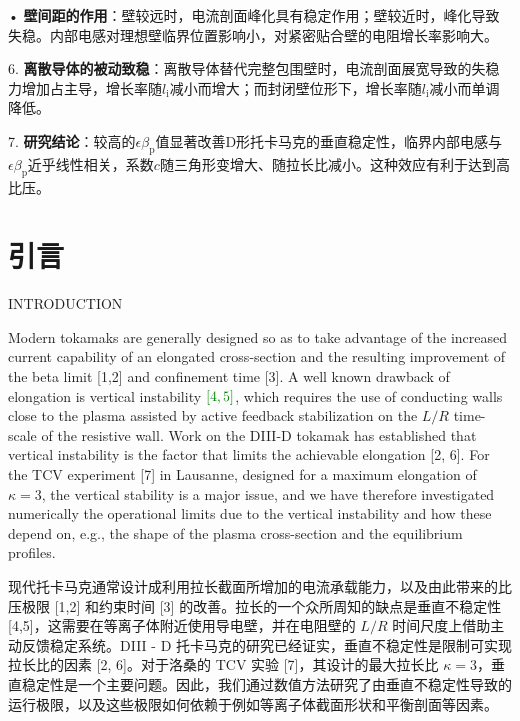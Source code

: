 \documentclass[utf8]{ctexart}
\newcommand\mainskip{-5pt}
\newcommand\enzhbox[2]{
  	\quad\par \begin{paracol}{2} \colseprulecolor{black} 
  		\begin{spacing}{1.0}
  			\footnotesize  #1
  		\end{spacing}
  		\switchcolumn[1] 
  		#2
  	\end{paracol} \quad\par
  }
\begin{document}
\begin{sloppypar}
\begin{adjustwidth}{0.1\linewidth}{0.1\linewidth}
  • \textbf{壁间距的作用}：壁较远时，电流剖面峰化具有稳定作用；壁较近时，峰化导致失稳。内部电感对理想壁临界位置影响小，对紧密贴合壁的电阻增长率影响大。

6. \textbf{离散导体的被动致稳}：离散导体替代完整包围壁时，电流剖面展宽导致的失稳力增加占主导，增长率随$l_{\mathrm{i}}$减小而增大；而封闭壁位形下，增长率随$l_{\mathrm{i}}$减小而单调降低。

7. \textbf{研究结论}：较高的$\epsilon \beta_{\mathrm{p}}$值显著改善D形托卡马克的垂直稳定性，临界内部电感与$\epsilon \beta_{\mathrm{p}}$近乎线性相关，系数$c$随三角形变增大、随拉长比减小。这种效应有利于达到高比压。  \end{adjustwidth}   \setlength{\parskip}{\mainskip}
 
  
  
 \section{引言}
 {  \small INTRODUCTION \par }
 
\enzhbox{  Modern tokamaks are generally designed so as to take advantage of the increased current capability of an elongated cross-section and the resulting improvement of the beta limit \textcolor{green!50!black}{[1,2]} and confinement time \textcolor{green!50!black}{[3]}. A well known drawback of elongation is vertical instability $\textcolor{green!50!black}{[4,5]}$, which requires the use of conducting walls close to the plasma assisted by active feedback stabilization on the $L / R$ time-scale of the resistive wall. Work on the DIII-D tokamak has established that vertical instability is the factor that limits the achievable elongation \textcolor{green!50!black}{[2, 6]}. For the TCV experiment \textcolor{green!50!black}{[7]} in Lausanne, designed for a maximum elongation of $\kappa=3$, the vertical stability is a major issue, and we have therefore investigated numerically the operational limits due to the vertical instability and how these depend on, e.g., the shape of the plasma cross-section and the equilibrium profiles.}{
现代托卡马克通常设计成利用拉长截面所增加的电流承载能力，以及由此带来的比压极限 \textcolor{green!50!black}{[1,2]} 和约束时间 \textcolor{green!50!black}{[3]} 的改善。拉长的一个众所周知的缺点是垂直不稳定性 \textcolor{green!50!black}{[4,5]}，这需要在等离子体附近使用导电壁，并在电阻壁的 $L / R$ 时间尺度上借助主动反馈稳定系统。DIII - D 托卡马克的研究已经证实，垂直不稳定性是限制可实现拉长比的因素 \textcolor{green!50!black}{[2, 6]}。对于洛桑的 TCV 实验 \textcolor{green!50!black}{[7]}，其设计的最大拉长比 $\kappa = 3$，垂直稳定性是一个主要问题。因此，我们通过数值方法研究了由垂直不稳定性导致的运行极限，以及这些极限如何依赖于例如等离子体截面形状和平衡剖面等因素。 }
  

\end{sloppypar}
\end{document}
